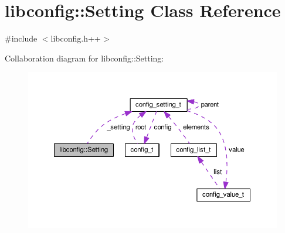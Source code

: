 \hypertarget{classlibconfig_1_1Setting}{\section{libconfig\-:\-:Setting Class Reference}
\label{classlibconfig_1_1Setting}
}


{\ttfamily \#include $<$libconfig.\-h++$>$}



Collaboration diagram for libconfig\-:\-:Setting\-:\nopagebreak
\begin{figure}[H]
\begin{center}
\leavevmode
\includegraphics[width=350pt]{classlibconfig_1_1Setting__coll__graph}
\end{center}
\end{figure}
